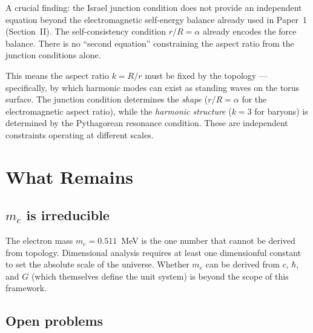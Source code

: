 \documentclass[11pt,a4paper]{article}
\begin{document}
A crucial finding: the Israel junction condition does not provide an independent equation beyond the electromagnetic self-energy balance already used in Paper~1 (Section~II). The self-consistency condition $r/R = \alpha$ already encodes the force balance. There is no ``second equation'' constraining the aspect ratio from the junction conditions alone.

This means the aspect ratio $k = R/r$ must be fixed by the topology --- specifically, by which harmonic modes can exist as standing waves on the torus surface. The junction condition determines the \emph{shape} ($r/R = \alpha$ for the electromagnetic aspect ratio), while the \emph{harmonic structure} ($k = 3$ for baryons) is determined by the Pythagorean resonance condition. These are independent constraints operating at different scales.

\section{What Remains}
\label{sec:open}

\subsection{$m_e$ is irreducible}

The electron mass $m_e = 0.511$~MeV is the one number that cannot be derived from topology. Dimensional analysis requires at least one dimensionful constant to set the absolute scale of the universe. Whether $m_e$ can be derived from $c$, $\hbar$, and $G$ (which themselves define the unit system) is beyond the scope of this framework.

\subsection{Open problems}
\end{document}
